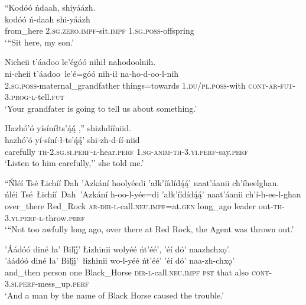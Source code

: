 \ea\label{ex:text2-8-1}
``Kodóó ńdaah, shiyáázh.\\
\gll kodóó	ń-daah	shi-yáázh\\
     from\_here	2.\textsc{sg}.\textsc{zero}.\textsc{impf}-sit.\textsc{impf}	1.\textsc{sg}.\textsc{poss}-offspring\\
\glt `{``}Sit here, my son.'
\z

\ea\label{ex:text2-8-2}
Nicheii t’áadoo le’égóó nihił nahodoolnih.\\
\gll ni-cheii	t’áadoo~{le’é=góó}	nih-ił	na-ho-d-oo-l-nih\\
     2.\textsc{sg}.\textsc{poss}-maternal\_grandfather	things=towards	1.\textsc{du}/\textsc{pl}.\textsc{poss}-with	\textsc{cont}-\textsc{ar}-\textsc{fut}-3.\textsc{prog}-\textsc{l}-tell.\textsc{fut}\\
\glt `Your grandfater is going to tell us about something.'
\z

\ea\label{ex:text2-8-3}
Hazhó’ó yísíníłts’ą́ą́́ ,'' shizhdííniid.\\
\gll hazhó’ó	yí-síní-ł-ts’ą́ą́’	shi-zh-d-íí-niid\\
     carefully	\textsc{th}-2.\textsc{sg}.\textsc{si}.\textsc{perf}-\textsc{ł}-hear.\textsc{perf}	1.\textsc{sg}-\textsc{anim}-\textsc{th}-3.\textsc{yi}.\textsc{perf}-say.\textsc{perf}\\
\glt `Listen to him carefully,'' she told me.'
\z

\ea\label{ex:text2-9-1}
``Ńléí Tsé Łichíí Dah ’Azkání hoolyéedi ’ałk’íídídą́ą́’ naat’áanii ch’íheelghan.\\
\gll ńléi	Tsé~Łichíí~Dah~{’Azkání}	h-oo-l-yée=di	’ałk’íídídą́ą́’	naat’áanii	ch’í-h-ee-l-ghan\\
     over\_there	Red\_Rock	\textsc{ar}-\textsc{dir}-\textsc{l}-call.\textsc{neu}.\textsc{impf}=at.\textsc{gen}	long\_ago	leader	out-\textsc{th}-3.\textsc{yi}.\textsc{perf}-\textsc{l}-throw.\textsc{perf}\\
\glt `{``}Not too awfully long ago, over there at Red Rock, the Agent was thrown out.'
\z

\ea\label{ex:text2-9-2}
’Áádóó diné ła’ Bilį́į́’ Łizhinii wolyéé ńt’éé’, ’éí dó’ naazhchxǫ’.\\
\gll ’áádóó	diné	ła’	Bilį́į́’~{łizhinii}	wo-l-yéé	ńt’éé’	’éí	dó’	naa-zh-chxǫ’\\
     and\_then	person	one	Black\_Horse	\textsc{dir}-\textsc{l}-call.\textsc{neu}.\textsc{impf}	\textsc{pst}	that	also	\textsc{cont}-3.\textsc{si}.\textsc{perf}-mess\_up.\textsc{perf}\\
\glt `And a man by the name of Black Horse caused the trouble.'
\z

